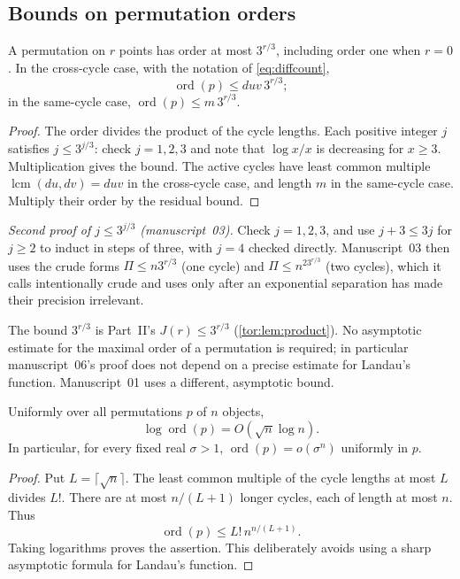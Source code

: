 \documentclass[11pt,a4paper]{article}
\numberwithin{equation}{section}
\theoremstyle{definition}
\theoremstyle{remark}
\newcommand{\ord}{\operatorname{ord}}
\newcommand{\lcm}{\operatorname{lcm}}
\begin{document}
\subsection{Bounds on permutation orders}\label{evo:sec:order}

\begin{lemma}\label{evo:lem:order}
A permutation on $r$ points has order at most $3^{r/3}$, including order one
when $r=0$. In the cross-cycle case, with the notation of \eqref{eq:diffcount},
\begin{equation}\label{evo:eq:crossorder}
 \ord(p)\le duv\,3^{r/3};
\end{equation}
in the same-cycle case, $\ord(p)\le m\,3^{r/3}$.
\end{lemma}
\begin{proof}
The order divides the product of the cycle lengths. Each positive integer $j$
satisfies $j\le3^{j/3}$: check $j=1,2,3$ and note that $\log x/x$ is
decreasing for $x\ge3$. Multiplication gives the bound. The active cycles have
least common multiple $\lcm(du,dv)=duv$ in the cross-cycle case, and length
$m$ in the same-cycle case. Multiply their order by the residual bound.
\end{proof}

\noindent\emph{Second proof of $j\le3^{j/3}$ (manuscript~03).} Check
$j=1,2,3$, and use $j+3\le3j$ for $j\ge2$ to induct in steps of three, with
$j=4$ checked directly. Manuscript~03 then uses the crude forms
$\Pi\le n3^{r/3}$ (one cycle) and $\Pi\le n^23^{r/3}$ (two cycles), which it
calls intentionally crude and uses only after an exponential separation has
made their precision irrelevant.

The bound $3^{r/3}$ is Part~II's $J(r)\le3^{r/3}$ (\cref{tor:lem:product}).
No asymptotic estimate for the maximal order of a permutation is required; in
particular manuscript~06's proof does not depend on a precise estimate for
Landau's function. Manuscript~01 uses a different, asymptotic bound.

\begin{lemma}\label{evo:et:lem:order}
Uniformly over all permutations $p$ of $n$ objects,
\[
 \log\ord(p)=O(\sqrt n\log n).
\]
In particular, for every fixed real $\sigma>1$, $\ord(p)=o(\sigma^n)$ uniformly
in $p$.
\end{lemma}
\begin{proof}
Put $L=\lceil\sqrt n\rceil$. The least common multiple of the cycle lengths
at most $L$ divides $L!$. There are at most $n/(L+1)$ longer cycles, each of
length at most $n$. Thus
\[
 \ord(p)\le L!\,n^{n/(L+1)}.
\]
Taking logarithms proves the assertion. This deliberately avoids using a
sharp asymptotic formula for Landau's function.
\end{proof}
\end{document}
